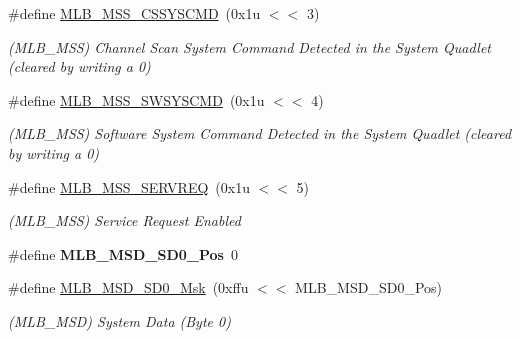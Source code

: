 \begin{DoxyCompactItemize}
\mbox{\label{group__SAMV71__MLB_ga4c9176aaca198dd3fcb040e77df39451}} 
\#define \mbox{\hyperlink{group__SAMV71__MLB_ga4c9176aaca198dd3fcb040e77df39451}{M\+L\+B\+\_\+\+M\+S\+S\+\_\+\+C\+S\+S\+Y\+S\+C\+MD}}~(0x1u $<$$<$ 3)
\begin{DoxyCompactList}\small\item\em (M\+L\+B\+\_\+\+M\+SS) Channel Scan System Command Detected in the System Quadlet (cleared by writing a 0) \end{DoxyCompactList}\item 
\mbox{\label{group__SAMV71__MLB_ga64d387793a32f9cb871ec0c656e36ea9}} 
\#define \mbox{\hyperlink{group__SAMV71__MLB_ga64d387793a32f9cb871ec0c656e36ea9}{M\+L\+B\+\_\+\+M\+S\+S\+\_\+\+S\+W\+S\+Y\+S\+C\+MD}}~(0x1u $<$$<$ 4)
\begin{DoxyCompactList}\small\item\em (M\+L\+B\+\_\+\+M\+SS) Software System Command Detected in the System Quadlet (cleared by writing a 0) \end{DoxyCompactList}\item 
\mbox{\label{group__SAMV71__MLB_ga519fe3fb6144ec7dde54ca061c34d3f5}} 
\#define \mbox{\hyperlink{group__SAMV71__MLB_ga519fe3fb6144ec7dde54ca061c34d3f5}{M\+L\+B\+\_\+\+M\+S\+S\+\_\+\+S\+E\+R\+V\+R\+EQ}}~(0x1u $<$$<$ 5)
\begin{DoxyCompactList}\small\item\em (M\+L\+B\+\_\+\+M\+SS) Service Request Enabled \end{DoxyCompactList}\item 
\mbox{\label{group__SAMV71__MLB_ga71583be0024ae17c7b64d370dc9fe8e1}} 
\#define {\bfseries M\+L\+B\+\_\+\+M\+S\+D\+\_\+\+S\+D0\+\_\+\+Pos}~0
\item 
\mbox{\label{group__SAMV71__MLB_gac3c0562a3f818a6dc875db364e4d3588}} 
\#define \mbox{\hyperlink{group__SAMV71__MLB_gac3c0562a3f818a6dc875db364e4d3588}{M\+L\+B\+\_\+\+M\+S\+D\+\_\+\+S\+D0\+\_\+\+Msk}}~(0xffu $<$$<$ M\+L\+B\+\_\+\+M\+S\+D\+\_\+\+S\+D0\+\_\+\+Pos)
\begin{DoxyCompactList}\small\item\em (M\+L\+B\+\_\+\+M\+SD) System Data (Byte 0) \end{DoxyCompactList}\item 

\end{DoxyCompactItemize}
